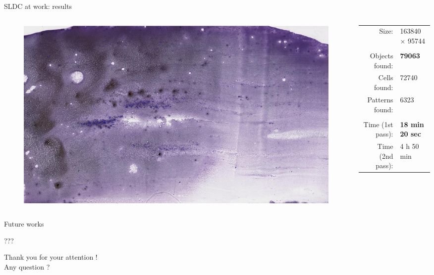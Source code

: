 \documentclass{beamer}
\begin{document}
\begin{frame}{SLDC at work: results}
	\begin{columns}
		\begin{column}{0.40\linewidth}
			\begin{figure}
				\center
				\includegraphics[scale=0.20]{images/716528.png}
			\end{figure}
		\end{column}
		\vspace*{0.5cm}
		\begin{column}{0.47\linewidth}
		\begin{tabular}{rl}
				Size: & 163840 $\times$ 95744 \\
				& \\
				Objects found: & \textbf{79063} \\
				Cells found: & 72740 \\
				Patterns found: & 6323 \\
				& \\
				Time (1st pass): & \textbf{18 min 20 sec} \\
				Time (2nd pass): & 4 h 50 min  \\
			\end{tabular}
		\end{column}
	\end{columns}
	
\end{frame}


\begin{frame}{Future works}

???

\end{frame}


\begin{frame}
	\vfill
	\begin{center}
		Thank you for your attention ! \\
		Any question ?
	\end{center}
	\vfill
\end{frame}
\end{document}
